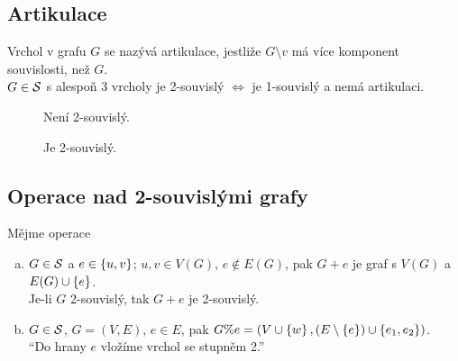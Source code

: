 \newpage
\subsection{Artikulace}\label{artikulace}
Vrchol v grafu $G$ se nazývá artikulace, jestliže $G \setminus v$ má více komponent souvislosti, než $G$.\\
 $G \in \S$ s alespoň 3 vrcholy je 2-souvislý $\iff$ je 1-souvislý a nemá artikulaci.
\begin{figure}[H]
    \centering
    \begin{minipage}[c]{0.3\textwidth}
        \begin{figure}[H]
        \end{figure}
        Není 2-souvislý.
    \end{minipage}%
    \hspace{0.1\textwidth}
    \begin{minipage}[c]{0.3\textwidth}
        \begin{figure}[H]
        \end{figure}
        Je 2-souvislý.
    \end{minipage}
\end{figure}

\subsection{Operace nad 2-souvislými grafy}
Mějme operace
\begin{enumerate}[(a)]
    \item $G \in \S$ a $e \in \bc{u,v}$; $u, v \in V(G)$, $e \not\in E(G)$, pak
    $G + e$ je graf s $V(G)$ a $E(G) \cup \bc{e}$. \\ Je-li $G$ 2-souvislý, tak $G+e$ je 2-souvislý.
    \item $G \in \S$, $G = (V,E)$, $e \in E$, pak
    $G \% e = \left(V \cup \bc{w}, (E \setminus \bc{e}) \cup \bc{e_1, e_2}\right)$. \\
    \enquote{Do hrany $e$ vložíme vrchol se stupněm 2.}
\end{enumerate}


